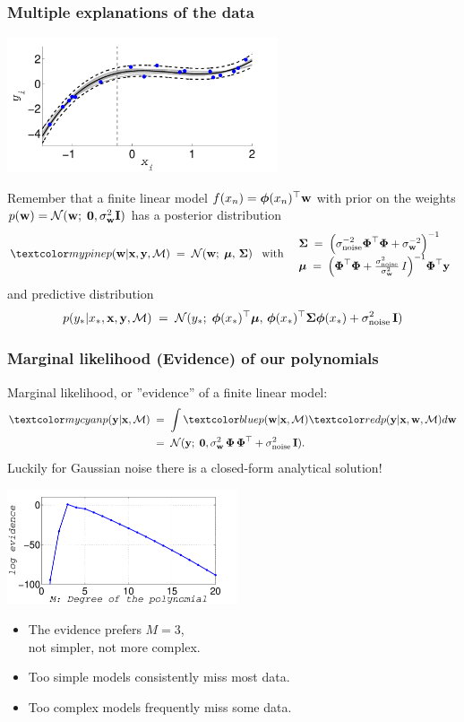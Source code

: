 \begin{frame}
\frametitle{Multiple explanations of the data}

\vskip 1.5mm
\centerline{\includegraphics[width=0.6\textwidth]{polynomial_deg3_predictive_dist_and_post_samples}}

Remember that a finite linear model $f(x_n)=\boldsymbol{\phi}(x_n)^\top\mathbf w$ with prior on the weights 
$p(\mathbf w)=\mathcal{N}(\mathbf w;\; \mathbf{0}, \sigma_\mathbf w^2 \mathbf I)$ has a posterior distribution
\[
\Green{p({\bf w}|{\bf x},{\bf y},\mathcal{M})}\;=\;\N(\bfw;\;\bmu,\,\bSigma)
\mathrm{\; \; \; with \; \; \;}
\begin{array}{l}
\bSigma\;=\;\left(\sigma_\mathrm{noise}^{-2}\bPhi^\top\bPhi+ \sigma_\bfw^{-2}\right)^{-1}\\
\bmu\;=\;\Big(\bPhi^\top\bPhi+ \frac{\sigma_\mathrm{noise}^2}{\sigma_\bfw^2}\,I\Big)^{-1}\bPhi^\top\bfy
\end{array}
\]
and predictive distribution
\[
p(y_*|x_*,{\bf x}, {\bf y},\mathcal{M})\;=\;
\mathcal{N}(y_*;\; \boldsymbol{\phi}(x_*)^\top{\boldsymbol{\mu}},\,\boldsymbol{\phi}(x_*)^\top\boldsymbol{\Sigma}\boldsymbol{\phi}(x_*)+\sigma_\mathrm{noise}^2\,\mathbf I)
\]
\end{frame}



\begin{frame}
\frametitle{Marginal likelihood (Evidence) of our polynomials}

Marginal likelihood, or ''evidence'' of a finite linear model:
\[
\begin{split}
\Cyan{p({\bf y}|{\bf x},\mathcal{M})}\;&=\;
\int \Blue{p({\bf w}|\bfx,\mathcal{M})}
\Red{p(\bfy|\bfx,\bfw,\mathcal{M})}  d{\bf w}\\
&=\;\N(\bfy;\;\mathbf{0},\sigma_\bfw^2\,\bPhi\,\bPhi^\top+\sigma_\mathrm{noise}^2\,\bfI).
\end{split}
\]
Luckily for Gaussian noise there is a closed-form analytical solution!
%
\parbox{0.5\textwidth}{
\centerline{\includegraphics[width=0.51\textwidth]{polynomial_evidence}}
}
\hfill
\parbox{0.49\textwidth}{
\begin{itemize}
\item The evidence prefers $M=3$,\\ not simpler, not more complex.
\item Too simple models consistently miss most data.
\item Too complex models frequently miss some data.
\end{itemize}
}
\end{frame}


